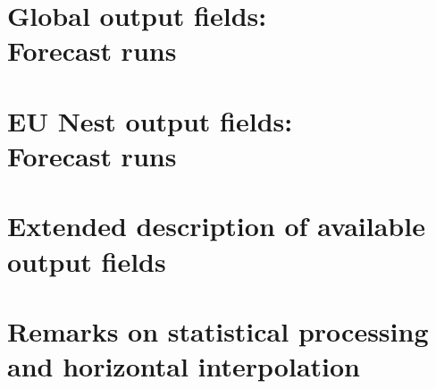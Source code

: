 \documentclass[a4paper,twoside,10pt]{book}
\begin{document}
\mainmatter                   %











\chapter[Global output fields: Forecast runs]{Global output fields:\\ Forecast runs}



\chapter[EU Nest output fields: Forecast runs]{EU Nest output fields:\\ Forecast runs}
\label{nest:chap_forecast_runs}

%


\chapter{Extended description of available output fields}




\chapter[Remarks on statistical processing and horizontal interpolation]{Remarks on statistical processing and horizontal interpolation}
\end{document}

